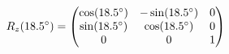 \documentclass[preview]{standalone}
\begin{document}
\begin{align*}
\special{dvisvgm:raw <g id='unique000'>}R_z(18.5^\circ) = \begin{pmatrix} \cos(18.5^\circ) & -\sin(18.5^\circ) & 0 \\ \sin(18.5^\circ) & \cos(18.5^\circ) & 0 \\ 0 & 0 & 1 \end{pmatrix}\special{dvisvgm:raw </g>}
\end{align*}
\end{document}
